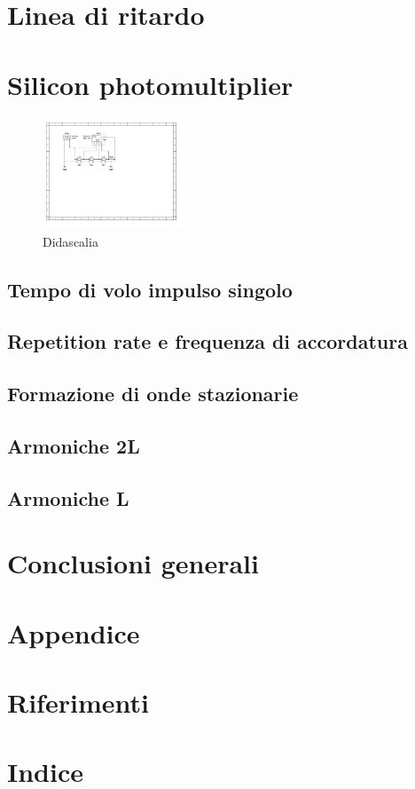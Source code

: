 \documentclass[journal]{IEEEtran}
\begin{document}
\section{Linea di ritardo} %

\section{Silicon photomultiplier} %

\begin{figure}[H]%
\begin {center}
\includegraphics[width=0.38\textwidth]{sch-simulations/output/Transmission line.pdf}
\caption{Didascalia}
\label{fig:oscilloscope}
\end {center}
\end{figure}

\subsection{Tempo di volo impulso singolo}

\subsection{Repetition rate e frequenza di accordatura}

\subsection{Formazione di onde stazionarie}

\subsection{Armoniche 2L}

\subsection{Armoniche L}

\section{Conclusioni generali} %


\section{Appendice}


\section{Riferimenti}
\printbibliography

\section{Indice}
\tableofcontents
\end{document}
